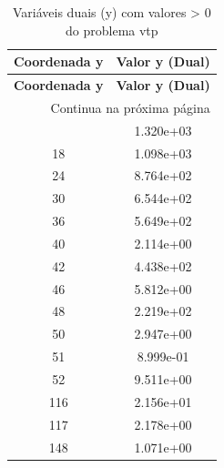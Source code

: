 \documentclass[12pt]{article}
\begin{document}
\begin{longtable}{@{}cc@{}}
\caption{Variáveis duais (y) com valores > 0 do problema vtp} \\
\toprule
\textbf{Coordenada y} & \textbf{Valor y (Dual)} \\
\midrule
\endfirsthead

\toprule
\textbf{Coordenada y} & \textbf{Valor y (Dual)} \\
\midrule
\endhead

\midrule \multicolumn{2}{r}{{Continua na próxima página}} \\ \midrule
\endfoot

\bottomrule
\endlastfoot
12 & 1.320e+03 \\
18 & 1.098e+03 \\
24 & 8.764e+02 \\
30 & 6.544e+02 \\
36 & 5.649e+02 \\
40 & 2.114e+00 \\
42 & 4.438e+02 \\
46 & 5.812e+00 \\
48 & 2.219e+02 \\
50 & 2.947e+00 \\
51 & 8.999e-01 \\
52 & 9.511e+00 \\
116 & 2.156e+01 \\
117 & 2.178e+00 \\
148 & 1.071e+00 \\

\bottomrule
\end{longtable}
\end{document}
